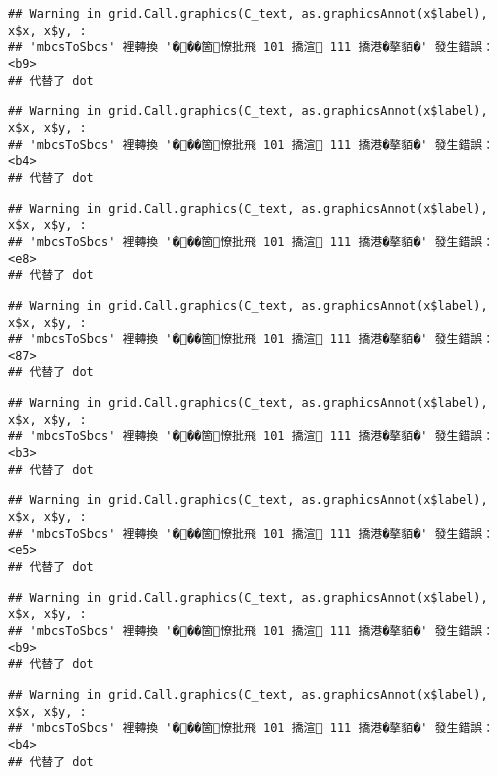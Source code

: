 \documentclass[
]{article}
\begin{document}
\begin{verbatim}
## Warning in grid.Call.graphics(C_text, as.graphicsAnnot(x$label), x$x, x$y, :
## 'mbcsToSbcs' 裡轉換 '���箇憭批飛 101 撟渲 111 撟港�摮貊�' 發生錯誤：<b9>
## 代替了 dot
\end{verbatim}

\begin{verbatim}
## Warning in grid.Call.graphics(C_text, as.graphicsAnnot(x$label), x$x, x$y, :
## 'mbcsToSbcs' 裡轉換 '���箇憭批飛 101 撟渲 111 撟港�摮貊�' 發生錯誤：<b4>
## 代替了 dot
\end{verbatim}

\begin{verbatim}
## Warning in grid.Call.graphics(C_text, as.graphicsAnnot(x$label), x$x, x$y, :
## 'mbcsToSbcs' 裡轉換 '���箇憭批飛 101 撟渲 111 撟港�摮貊�' 發生錯誤：<e8>
## 代替了 dot
\end{verbatim}

\begin{verbatim}
## Warning in grid.Call.graphics(C_text, as.graphicsAnnot(x$label), x$x, x$y, :
## 'mbcsToSbcs' 裡轉換 '���箇憭批飛 101 撟渲 111 撟港�摮貊�' 發生錯誤：<87>
## 代替了 dot
\end{verbatim}

\begin{verbatim}
## Warning in grid.Call.graphics(C_text, as.graphicsAnnot(x$label), x$x, x$y, :
## 'mbcsToSbcs' 裡轉換 '���箇憭批飛 101 撟渲 111 撟港�摮貊�' 發生錯誤：<b3>
## 代替了 dot
\end{verbatim}

\begin{verbatim}
## Warning in grid.Call.graphics(C_text, as.graphicsAnnot(x$label), x$x, x$y, :
## 'mbcsToSbcs' 裡轉換 '���箇憭批飛 101 撟渲 111 撟港�摮貊�' 發生錯誤：<e5>
## 代替了 dot
\end{verbatim}

\begin{verbatim}
## Warning in grid.Call.graphics(C_text, as.graphicsAnnot(x$label), x$x, x$y, :
## 'mbcsToSbcs' 裡轉換 '���箇憭批飛 101 撟渲 111 撟港�摮貊�' 發生錯誤：<b9>
## 代替了 dot
\end{verbatim}

\begin{verbatim}
## Warning in grid.Call.graphics(C_text, as.graphicsAnnot(x$label), x$x, x$y, :
## 'mbcsToSbcs' 裡轉換 '���箇憭批飛 101 撟渲 111 撟港�摮貊�' 發生錯誤：<b4>
## 代替了 dot
\end{verbatim}
\end{document}
